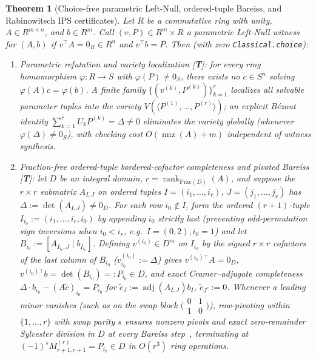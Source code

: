 \documentclass[11pt]{article}
\theoremstyle{plain}
\newtheorem{theorem}{Theorem}[section]
\theoremstyle{definition}
\begin{document}
\begin{theorem}[Choice-free parametric Left-Null, ordered-tuple Bareiss, and Rabinowitsch $\mathrm{IPS}$ certificates]\label{thm:left-null-bareiss-ips}
Let $R$ be a commutative ring with unity, $A \in R^{m \times n}$, and $b \in R^m$. Call $(v, P) \in R^m \times R$ a \emph{parametric Left-Null witness} for $(A, b)$ if $v^\top A = 0_R \in R^n$ and $v^\top b = P$. Then (with zero \texttt{Classical.choice}):
\begin{enumerate}[nosep,label=(\roman*)]
\item \emph{Parametric refutation and variety localization \textup{[\textbf{T}]}}: for every ring homomorphism $\varphi : R \to S$ with $\varphi(P) \neq 0_S$, there exists no $c \in S^n$ solving $\varphi(A)c = \varphi(b)$. A finite family $\{(v^{(k)}, P^{(k)})\}_{k=1}^r$ localizes all solvable parameter tuples into the variety $V(\langle P^{(1)}, \dots, P^{(r)} \rangle)$; an explicit B\'ezout identity $\sum_{k=1}^r U_k P^{(k)} = \Delta \neq 0$ eliminates the variety globally (whenever $\varphi(\Delta) \neq 0_S$), with checking cost $O(\operatorname{nnz}(A) + m)$ independent of witness synthesis.
\item \emph{Fraction-free ordered-tuple bordered-cofactor completeness and pivoted Bareiss \textup{[\textbf{T}]}}: let $D$ be an integral domain, $r = \operatorname{rank}_{\mathrm{Frac}(D)}(A)$, and suppose the $r \times r$ submatrix $A_{I,J}$ on ordered tuples $I = (i_1, \dots, i_r)$, $J = (j_1, \dots, j_r)$ has $\Delta := \det(A_{I,J}) \neq 0_D$. For each row $i_0 \notin I$, form the ordered $(r+1)$-tuple $I_{i_0} := (i_1, \dots, i_r, i_0)$ by appending $i_0$ strictly \emph{last} (preventing odd-permutation sign inversions when $i_0 < i_r$, e.g.\ $I=(0,2), i_0=1$) and let $B_{i_0} := [A_{I_{i_0}, J} \mid b_{I_{i_0}}]$. Defining $v^{(i_0)} \in D^m$ on $I_{i_0}$ by the signed $r\times r$ cofactors of the last column of $B_{i_0}$ ($v^{(i_0)}_{i_0} := \Delta$) gives $v^{(i_0)\top} A = 0_D$, $v^{(i_0)\top} b = \det(B_{i_0}) =: P_{i_0} \in D$, and exact Cramer--adjugate completeness $\Delta \cdot b_{i_0} - (A\tilde{c})_{i_0} = P_{i_0}$ for $\tilde{c}_J := \operatorname{adj}(A_{I,J}) b_I$, $\tilde{c}_{J^c} := 0$. Whenever a leading minor vanishes (such as on the swap block $\bigl(\begin{smallmatrix} 0 & 1 \\ 1 & 0 \end{smallmatrix}\bigr)$), row-pivoting within $\{1,\dots,r\}$ with swap parity $s$ ensures nonzero pivots and exact zero-remainder Sylvester division in $D$ at every Bareiss step~\cite{Bareiss1968}, terminating at $(-1)^s M^{(r)}_{r+1,r+1} = P_{i_0} \in D$ in $O(r^3)$ ring operations.

\end{enumerate}
\end{theorem}
\end{document}
